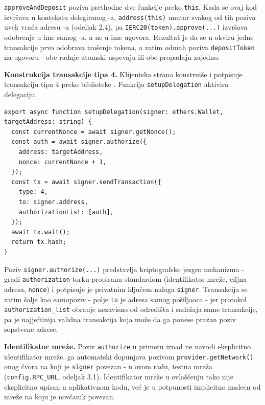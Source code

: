 \texttt{approveAndDeposit} poziva prethodne dve funkcije preko \texttt{this}. Kada se ovaj kod izvr\v sava u kontekstu delegiranog -a, \texttt{address(this)} unutar svakog od tih poziva uvek vra\' ca adresu -a (odeljak 2.4), pa \texttt{IERC20(token).approve(...)} izvr\v sava odobrenje u ime samog -a, a ne u ime  ugovora. Rezultat je da se u okviru jedne transakcije prvo odobrava tro\v senje tokena, a zatim odmah poziva \texttt{depositToken} na  ugovoru - obe radnje atomski uspevaju ili obe propadaju zajedno.

\textbf{Konstrukcija transakcije tipa 4.} Klijentska strana konstrui\v se i potpisuje transakciju tipa 4 preko  biblioteke \cite{ethersjs2024}. Funkcija \texttt{setupDelegation} aktivira delegaciju.

\begin{lstlisting}[caption={Konstrukcija ovla\v s\' cenja i transakcije tipa 4}, label={lst:setup-delegation}]
export async function setupDelegation(signer: ethers.Wallet, targetAddress: string) {
  const currentNonce = await signer.getNonce();
  const auth = await signer.authorize({
    address: targetAddress,
    nonce: currentNonce + 1,
  });
  const tx = await signer.sendTransaction({
    type: 4,
    to: signer.address,
    authorizationList: [auth],
  });
  await tx.wait();
  return tx.hash;
}
\end{lstlisting}

Poziv \texttt{signer.authorize(...)} predstavlja kriptografsko jezgro mehanizma - gradi \texttt{authorization} torku propisanu  standardom (identifikator mre\v ze, ciljna adresa, \texttt{nonce}) i potpisuje je privatnim klju\v cem naloga \texttt{signer}. Transakcija se zatim \v salje kao samopoziv - polje \texttt{to} je adresa samog po\v siljaoca - jer protokol \texttt{authorization\_list} obra\dj uje nezavisno od odredi\v sta i sadr\v zaja same transakcije, pa je najjeftinija validna transakcija koja mo\v ze da ga ponese prazan poziv sopstvene adrese.

\textbf{Identifikator mre\v ze.} Poziv \texttt{authorize} u primeru iznad ne navodi eksplicitno identifikator mre\v ze.  ga automatski dopunjava pozivom \texttt{provider.getNetwork()} onog  \v cvora na koji je \texttt{signer} povezan \cite{ethersjs2024} - u ovom radu,  testna mre\v za (\texttt{config.RPC\_URL}, odeljak 3.1). Identifikator mre\v ze u ovla\v s\' cenju tako nije eksplicitno upisan u aplikativnom kodu, ve\' c je u potpunosti implicitno nasle\dj en od mre\v ze na koju je nov\v canik povezan.

